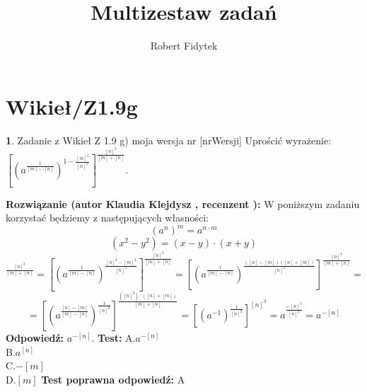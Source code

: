 \documentclass[12pt, a4paper]{article}
\title{Multizestaw zadań}
\author{Robert Fidytek}
\date{}
\theoremstyle{definition} %
\newtheorem{zad}{}
\newcommand{\kategoria}[1]{\section{#1}} %
\newcommand{\zadStart}[1]{\begin{zad}#1\newline} %
\newcommand{\zadStop}{\end{zad}}   %
\newcommand{\rozwStart}[2]{\noindent \textbf{Rozwiązanie (autor #1 , recenzent #2): }\newline} %
\newcommand{\rozwStop}{\newline}                                            %
\newcommand{\odpStart}{\noindent \textbf{Odpowiedź:}\newline}    %
\newcommand{\odpStop}{\newline}                                             %
\newcommand{\testStart}{\noindent \textbf{Test:}\newline} %
\newcommand{\testStop}{\newline} %
\newcommand{\kluczStart}{\noindent \textbf{Test poprawna odpowiedź:}\newline} %
\newcommand{\kluczStop}{\newline} %
\begin{document}
\maketitle


\kategoria{Wikieł/Z1.9g}
\zadStart{Zadanie z Wikieł Z 1.9 g) moja wersja nr [nrWersji]}
Uprościć wyrażenie: $
[(a^{\frac{1}{[m]-[n]}})^{1-\frac{[m]^2}{[n]^2}}]^{\frac{[n]^3}{[m]+[n]}}$.
\zadStop
\rozwStart{Klaudia Klejdysz}{}
W poniższym zadaniu korzystać będziemy z następujących własności:
\begin{equation*}
(a^n)^m=a^{n\cdot m}
\end{equation*}
\begin{equation*}
(x^2-y^2)=(x-y)\cdot(x+y)
\end{equation*}
\begin{equation*}
    [(a^{\frac{1}{[m]-[n]}})^{1-\frac{[m]^2}{[n]^2}}]^{\frac{[n]^3}{[m]+[n]}}=[(a^{\frac{1}{[m]-[n]}})^{\frac{[n]^2-[m]^2}{[n]^2}}]^{\frac{[n]^3}{[m]+[n]}}=[(a^{\frac{1}{[m]-[n]}})^{\frac{([n]-[m])([n]+[m])}{[n]^2}}]^{\frac{[n]^3}{[m]+[n]}}=
\end{equation*}
\begin{equation*}
    =[(a^{\frac{[n]-[m]}{[m]-[n]}})^{\frac{1}{[n]^2}}]^{\frac{([n]^3)\cdot([n]+[m])}{[m]+[n]}}=[(a^{-1})^{\frac{1}{[n]^2}}]^{[n]^3}=a^{\frac{-[n]^3}{[n]^2}}=a^{-[n]}
\end{equation*}
\rozwStop
\odpStart
$a^{-[n]}$.
\odpStop
\testStart
A.$a^{-[n]}$\\
B.$a^{[n]}$\\
C.$-[m]$\\
D.$[m]$
\testStop
\kluczStart
A
\kluczStop
\end{document}
